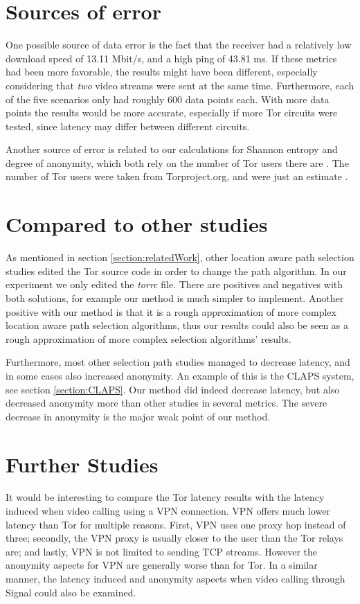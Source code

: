 \documentclass{kththesis}
\begin{document}
\section{Sources of error}
One possible source of data error is the fact that the receiver had a relatively low download speed of 13.11 Mbit/s, and a high ping of 43.81 ms. If these metrics had been more favorable, the results might have been different, especially considering that \emph{two} video streams were sent at the same time. Furthermore, each of the five scenarios only had roughly 600 data points each. With more data points the results would be more accurate, especially if more Tor circuits were tested, since latency may differ between different circuits.

Another source of error is related to our calculations for Shannon entropy and degree of anonymity, which both rely on the number of Tor users there are \parencite{tormetricsUserStats}. The number of Tor users were taken from Torproject.org, and were just an estimate \parencite{tormetricsAboutUserMetrics}.

\section{Compared to other studies}
As mentioned in section \ref{section:relatedWork}, other location aware path selection studies edited the Tor source code in order to change the path algorithm. In our experiment we only edited the \emph{torrc} file. There are positives and negatives with both solutions, for example our method is much simpler to implement. Another positive with our method is that it is a rough approximation of more complex location aware path selection algorithms, thus our results could also be seen as a rough approximation of more complex selection algorithms' results.

Furthermore, most other selection path studies managed to decrease latency, and in some cases also increased anonymity. An example of this is the CLAPS system, see section \ref{section:CLAPS}. Our method did indeed decrease latency, but also decreased anonymity more than other studies in several metrics. The severe decrease in anonymity is the major weak point of our method.

\section{Further Studies}
It would be interesting to compare the Tor latency results with the latency induced when video calling using a VPN connection. VPN offers much lower latency than Tor for multiple reasons. First, VPN uses one proxy hop instead of three; secondly, the VPN proxy is usually closer to the user than the Tor relays are; and lastly, VPN is not limited to sending TCP streams. However the anonymity aspects for VPN are generally worse than for Tor. In a similar manner, the latency induced and anonymity aspects when video calling through Signal could also be examined.
\end{document}
